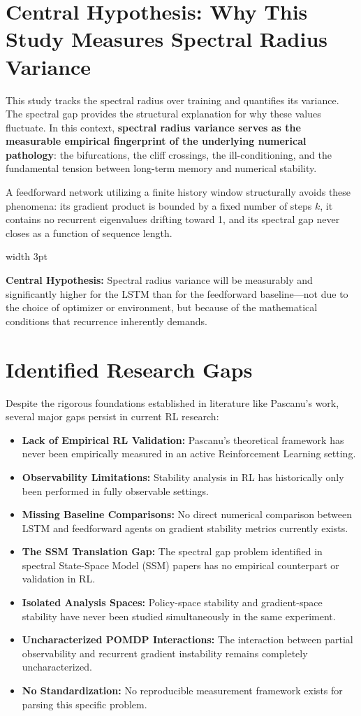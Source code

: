 \documentclass[11pt,a4paper]{article}
\newenvironment{technicalnote}{%
    \medskip
    \noindent
    \color{black!90}%
    \vrule width 3pt \hspace{10pt}%
    \begin{minipage}{\dimexpr\textwidth-15pt}%
    \itshape
}{%
    \end{minipage}%
    \medskip
}
\begin{document}
\section{Central Hypothesis: Why This Study Measures Spectral Radius Variance}
This study tracks the spectral radius over training and quantifies its variance. The spectral gap provides the structural explanation for why these values fluctuate. In this context, \textbf{spectral radius variance serves as the measurable empirical fingerprint of the underlying numerical pathology}: the bifurcations, the cliff crossings, the ill-conditioning, and the fundamental tension between long-term memory and numerical stability.

A feedforward network utilizing a finite history window structurally avoids these phenomena: its gradient product is bounded by a fixed number of steps $k$, it contains no recurrent eigenvalues drifting toward 1, and its spectral gap never closes as a function of sequence length.

\begin{technicalnote}
\textbf{Central Hypothesis:} Spectral radius variance will be measurably and significantly higher for the LSTM than for the feedforward baseline---not due to the choice of optimizer or environment, but because of the mathematical conditions that recurrence inherently demands.
\end{technicalnote}

\section{Identified Research Gaps}
Despite the rigorous foundations established in literature like Pascanu's work, several major gaps persist in current RL research:
\begin{itemize}
    \item \textbf{Lack of Empirical RL Validation:} Pascanu's theoretical framework has never been empirically measured in an active Reinforcement Learning setting.
    \item \textbf{Observability Limitations:} Stability analysis in RL has historically only been performed in fully observable settings.
    \item \textbf{Missing Baseline Comparisons:} No direct numerical comparison between LSTM and feedforward agents on gradient stability metrics currently exists.
    \item \textbf{The SSM Translation Gap:} The spectral gap problem identified in spectral State-Space Model (SSM) papers has no empirical counterpart or validation in RL.
    \item \textbf{Isolated Analysis Spaces:} Policy-space stability and gradient-space stability have never been studied simultaneously in the same experiment.
    \item \textbf{Uncharacterized POMDP Interactions:} The interaction between partial observability and recurrent gradient instability remains completely uncharacterized.
    \item \textbf{No Standardization:} No reproducible measurement framework exists for parsing this specific problem.
\end{itemize}
\end{document}
